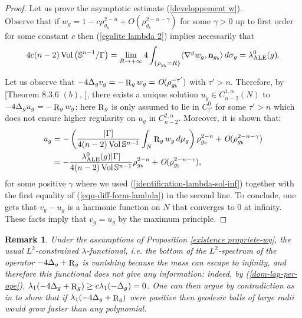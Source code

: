 \documentclass[a4paper,11pt,reqno]{amsart}
\newtheorem{rk}[defn]{Remark}
\def\vol{\mathop{\rm vol}\nolimits}
\def\vol{\mathop{\rm Vol}\nolimits}
\def\vol{\mathop{\rm vol}\nolimits}
\def\vol{\mathop{\rm Vol}\nolimits}
\def\R{\mathop{\rm R}\nolimits}
\numberwithin{equation}{section}
\begin{document}
\begin{proof}
		Let us prove the asymptotic estimate (\ref{developpement w}).\\
		
		Observe that if $w_g=1-c\rho_{g_b}^{2-n}+\textit{O}(\rho_{g_b}^{2-n-\gamma})$ for some $\gamma>0$ up to first order for some constant $c$ then (\ref{egalite lambda 2}) implies necessarily that 
		\begin{eqnarray}
		4c(n-2)\vol\left(\mathbb{S}^{n-1}/\Gamma\right)=\lim_{R\rightarrow+\infty}4\int_{\{\rho_{g_b}= R\}}\langle\nabla^gw_g,\mathbf{n}_{g_b}\rangle\,d\sigma_g=\lambda_{\operatorname{ALE}}^0(g).\label{identification-lambda-sol-inf}
		\end{eqnarray}
		
		Let us observe that $-4\Delta_gv_g=-\R_gw_g=\textit{O}(\rho_{g_b}^{-\tau'})$ with $\tau'>n$. Therefore, by [Theorem $8.3.6$ $(b)$, \cite{Joy-Book}], there exists a unique solution $u_g\in C^{1,\alpha}_{n-2}(N)$ to $-4\Delta_gu_g=-\R_gw_g$: here $\R_g$ is only assumed to lie in $C^0_{\tau'}$ for some $\tau'>n$ which does not ensure higher regularity on $u_g$ in $C^{2,\alpha}_{n-2}$. Moreover, it is shown that:
		\begin{equation*}
		\begin{split}
		u_g&=-\left(\frac{|\Gamma]}{4(n-2)\vol\mathbb{S}^{n-1}}\int_N\R_gw_g\,d\mu_g\right)\rho_{g_b}^{2-n}+\textit{O}(\rho_{g_b}^{2-n-\gamma})\\
		&=-\frac{\lambda_{\operatorname{ALE}}^0(g)|\Gamma]}{4(n-2)\vol\mathbb{S}^{n-1}}\rho_{g_b}^{2-n}+\textit{O}(\rho_{g_b}^{2-n-\gamma}),
		\end{split}
		\end{equation*}
		for some positive $\gamma$ where we used (\ref{identification-lambda-sol-inf}) together with the first equality of (\ref{equ-diff-form-lambda}) in the second line. To conclude, one gets that $v_g-u_g$ is a harmonic function on $N$ that converges to $0$ at infinity. These facts imply that $v_g=u_g$ by the maximum principle.
	\end{proof}
	\begin{rk}
		Under the assumptions of Proposition \ref{existence propriete-wg}, the usual $L^2$-constrained $\lambda$-functional, i.e. the bottom of the $L^2$-spectrum of the operator $-4\Delta_g+\R_g$ is vanishing because the mass can escape to infinity, and therefore this functional does not give any information: indeed, by (\ref{dom-lap-per-ope}), $\lambda_1(-4\Delta_g+\R_g)\geq c\lambda_1(-\Delta_g)=0$. One can then argue by contradiction as in \cite{Cheng-Yau} to show that if $\lambda_1(-4\Delta_g+\R_g)$ were positive then geodesic balls of large radii would grow faster than any polynomial. 
	\end{rk}
	
\end{document}
